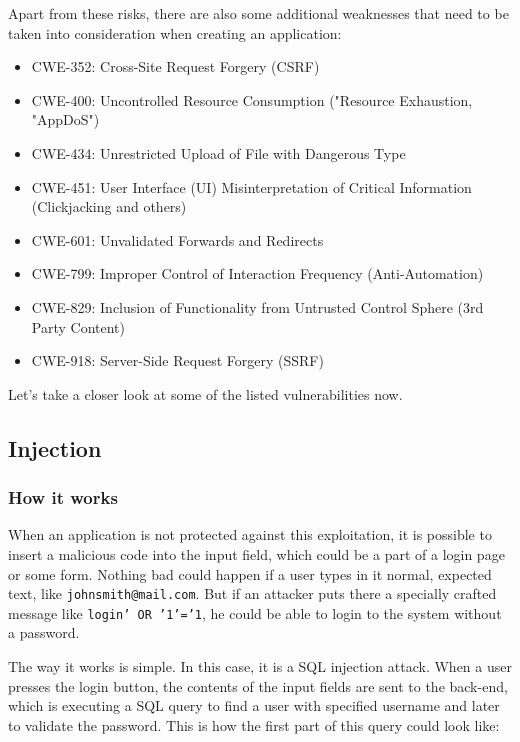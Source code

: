 \documentclass[a4paper]{article}
\begin{document}
Apart from these risks, there are also some additional weaknesses that need to
be taken into consideration when creating an application:

\begin{itemize}
	\item CWE-352: Cross-Site Request Forgery (CSRF)
	\item CWE-400: Uncontrolled Resource Consumption ("Resource Exhaustion,
		"AppDoS")
	\item CWE-434: Unrestricted Upload of File with Dangerous Type
	\item CWE-451: User Interface (UI) Misinterpretation of Critical
		Information (Clickjacking and others)
	\item CWE-601: Unvalidated Forwards and Redirects
	\item CWE-799: Improper Control of Interaction Frequency
		(Anti-Automation)
	\item CWE-829: Inclusion of Functionality from Untrusted Control Sphere
		(3rd Party Content)
	\item CWE-918: Server-Side Request Forgery (SSRF)
\end{itemize}

Let's take a closer look at some of the listed vulnerabilities now.

\subsection{Injection}

\subsubsection{How it works}

When an application is not protected against this exploitation, it is possible
to insert a malicious code into the input field, which could be a part of a
login page or some form. Nothing bad could happen if a user types in it normal,
expected text, like \texttt{johnsmith@mail.com}. But if an attacker puts there
a specially crafted message like \texttt{login' OR '1'='1}, he could be able to
login to the system without a password.\autocite{owasptop10}

The way it works is simple. In this case, it is a SQL injection
attack.\autocite{sqlinjection} When a user presses the login button, the
contents of the input fields are sent to the back-end, which is executing a SQL
query to find a user with specified username and later to validate the
password. This is how the first part of this query could look like:
\end{document}

